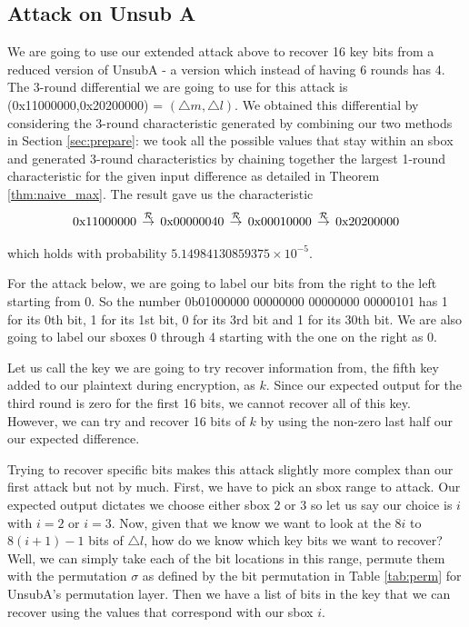 \documentclass[12pt,a4paper]{article}
\newcommand{\differ}[1] {\overset{#1}{\rightarrow}}
\newcommand{\bin}[1] {0b#1}
\newcommand{\hex}[1] {0x#1}
\newcommand{\hexp}[1] {\,\text{0x#1}\,}
\begin{document}
\subsection{Attack on Unsub A}
\label{sec:attack_unsubA}
We are going to use our extended attack above to recover 16 key bits from a
reduced version of UnsubA - a version which instead of having 6 rounds 
has 4. The 3-round differential we are going to use for this attack is
(\hex{11000000},\hex{20200000}) = $(\triangle m,\triangle l)$. We obtained this differential by considering
the 3-round characteristic generated by combining our two methods in Section
\ref{sec:prepare}: we took all the possible values that stay within an sbox and
generated 3-round characteristics by chaining together the largest 1-round
characteristic for the given input difference as detailed in Theorem
\ref{thm:naive_max}. The result gave us the
characteristic 
\[\hexp{11000000} \differ{{\cal{R}}}  \hexp{00000040} \differ{{\cal{R}}}
\hexp{00010000} \differ{{\cal{R}}} \hexp{20200000}\]

which holds with probability $5.14984130859375 \times 10^{-5}$.

For the attack below, we are going to label our bits from the right to the left
starting from 0. So the number \bin{01000000 00000000 00000000 00000101} has 1
for its 0th bit, 1 for its 1st bit, 0 for its 3rd bit and 1 for its 30th bit.
We are also going to label our sboxes 0 through 4 starting with the one on the
right as 0. 

Let us call the key we are going to try recover information from, the fifth key
added to our plaintext during encryption, as $k$. Since our expected output for
the third round is zero for the first 16 bits, we cannot recover all of this
key. However, we can try and recover 16 bits of $k$ by using the non-zero last half
our our expected difference. 

Trying to recover specific bits makes this attack slightly more complex than
our first attack but not by much. First, we have to pick an sbox range to
attack. Our expected output dictates we choose either sbox 2 or 3 so let us say
our choice is $i$ with $i=2$ or $i=3$. Now, given that we know we want to look at the $8i$ to
$8(i+1)-1$ bits of $\triangle l$, how do we know which key bits we want to
recover? Well, we can simply take each of the bit locations in this range,
permute them with the permutation $\sigma$ as defined by the bit permutation in
Table \ref{tab:perm} for UnsubA's permutation layer. Then we have a list of bits in the key that we can
recover using the values that correspond with our sbox $i$.
\end{document}
